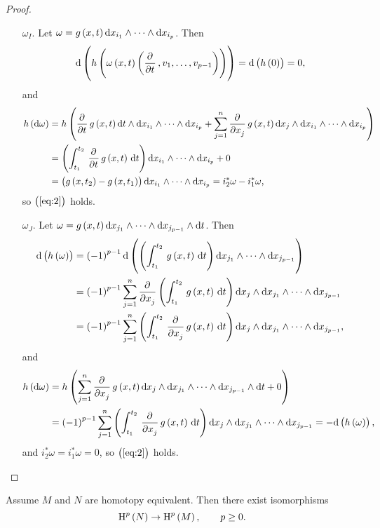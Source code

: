 \begin{proof}
\begin{enumerate}[label=Step \arabic*., leftmargin=0.5in]
\pagebreak

\begin{itemize}
\item[$ \omega_I $.] Let $ \omega = g\br{x, t}\d x_{i_1} \wedge \dots \wedge \d x_{i_p} $. Then
$$ \d\br{h\br{\omega\br{x, t}\br{\dpd{}{t}, v_1, \dots, v_{p - 1}}}} = \d\br{h\br{0}} = 0, $$
and
\begin{align*}
h\br{\d\omega}
& = h\br{\dpd{}{t}g\br{x, t}\d t \wedge \d x_{i_1} \wedge \dots \wedge \d x_{i_p} + \sum_{j = 1}^n \dpd{}{x_j}g\br{x, t}\d x_j \wedge \d x_{i_1} \wedge \dots \wedge \d x_{i_p}} \\
& = \br{\intd{t_1}{t_2}{\dpd{}{t}g\br{x, t}}{t}}\d x_{i_1} \wedge \dots \wedge \d x_{i_p} + 0 \\
& = \br{g\br{x, t_2} - g\br{x, t_1}}\d x_{i_1} \wedge \dots \wedge \d x_{i_p}
= i_2^*\omega - i_1^*\omega,
\end{align*}
so $ \br{\ref{eq:2}} $ holds.
\item[$ \omega_J $.] Let $ \omega = g\br{x, t}\d x_{j_1} \wedge \dots \wedge \d x_{j_{p - 1}} \wedge \d t $. Then
\begin{align*}
\d\br{h\br{\omega}}
& = \br{-1}^{p - 1}\d\br{\br{\intd{t_1}{t_2}{g\br{x, t}}{t}}\d x_{j_1} \wedge \dots \wedge \d x_{j_{p - 1}}} \\
& = \br{-1}^{p - 1}\sum_{j = 1}^n \dpd{}{x_j}\br{\intd{t_1}{t_2}{g\br{x, t}}{t}}\d x_j \wedge \d x_{j_1} \wedge \dots \wedge \d x_{j_{p - 1}} \\
& = \br{-1}^{p - 1}\sum_{j = 1}^n \br{\intd{t_1}{t_2}{\dpd{}{x_j}g\br{x, t}}{t}}\d x_j \wedge \d x_{j_1} \wedge \dots \wedge \d x_{j_{p - 1}},
\end{align*}
and
\begin{align*}
h\br{\d\omega}
& = h\br{\sum_{j = 1}^n \dpd{}{x_j}g\br{x, t}\d x_j \wedge \d x_{j_1} \wedge \dots \wedge \d x_{j_{p - 1}} \wedge \d t + 0} \\
& = \br{-1}^{p - 1}\sum_{j = 1}^n \br{\intd{t_1}{t_2}{\dpd{}{x_j}g\br{x, t}}{t}}\d x_j \wedge \d x_{j_1} \wedge \dots \wedge \d x_{j_{p - 1}}
= -\d\br{h\br{\omega}},
\end{align*}
and $ i_2^*\omega = i_1^*\omega = 0 $, so $ \br{\ref{eq:2}} $ holds.
\end{itemize}
\end{enumerate}
\end{proof}

\begin{corollary}
\label{cor:2.14}
Assume $ M $ and $ N $ are homotopy equivalent. Then there exist isomorphisms
$$ \H^p\br{N} \to \H^p\br{M}, \qquad p \ge 0. $$
\end{corollary}

